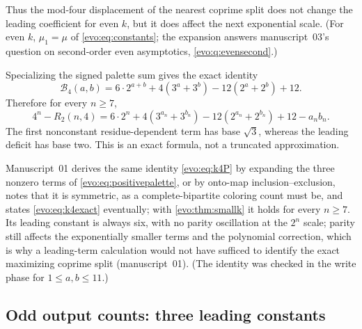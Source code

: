 \documentclass[11pt,a4paper]{article}
\numberwithin{equation}{section}
\theoremstyle{definition}
\theoremstyle{remark}
\newcommand{\Bip}{\mathcal B}
\begin{document}
Thus the mod-four displacement of the nearest coprime split does not change
the leading coefficient for even $k$, but it does affect the next exponential
scale. (For even $k$, $\mu_1=\mu$ of \eqref{evo:eq:constants}; the expansion
answers manuscript~03's question on second-order even asymptotics,
\cref{evo:q:evensecond}.)

\begin{example}\label{evo:ex:k4formula}
Specializing the signed palette sum gives the exact identity
\begin{equation}\label{evo:eq:k4P}
 \Bip_4(a,b)=6\cdot2^{a+b}+4(3^a+3^b)-12(2^a+2^b)+12.
\end{equation}
Therefore for every $n\ge7$,
\begin{equation}\label{evo:eq:k4exact}
 4^n-R_2(n,4)
 =6\cdot2^n+4(3^{a_n}+3^{b_n})-12(2^{a_n}+2^{b_n})+12-a_nb_n.
\end{equation}
The first nonconstant residue-dependent term has base $\sqrt3$, whereas the
leading deficit has base two. This is an exact formula, not a truncated
approximation.
\end{example}

Manuscript~01 derives the same identity \eqref{evo:eq:k4P} by expanding the
three nonzero terms of \eqref{evo:eq:positivepalette}, or by onto-map
inclusion--exclusion, notes that it is symmetric, as a complete-bipartite
coloring count must be, and states \eqref{evo:eq:k4exact} eventually; with
\cref{evo:thm:smallk} it holds for every $n\ge7$. Its leading constant is
always six, with no parity oscillation at the $2^n$ scale; parity still
affects the exponentially smaller terms and the polynomial correction, which
is why a leading-term calculation would not have sufficed to identify the
exact maximizing coprime split (manuscript~01). (The identity was checked in
the write phase for $1\le a,b\le11$.)

\subsection{Odd output counts: three leading constants}
\end{document}
